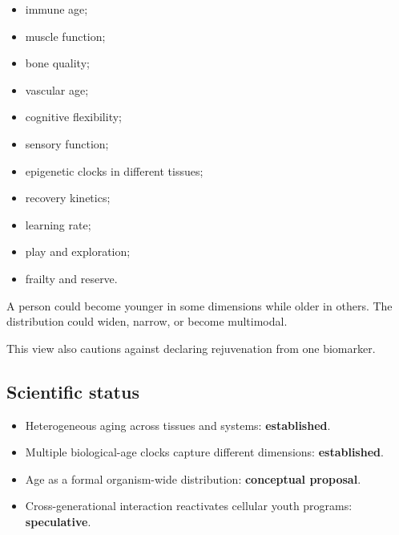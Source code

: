 \begin{itemize}
\tightlist
\item
  immune age;
\item
  muscle function;
\item
  bone quality;
\item
  vascular age;
\item
  cognitive flexibility;
\item
  sensory function;
\item
  epigenetic clocks in different tissues;
\item
  recovery kinetics;
\item
  learning rate;
\item
  play and exploration;
\item
  frailty and reserve.
\end{itemize}

A person could become younger in some dimensions while older in others. The distribution could widen, narrow, or become multimodal.

This view also cautions against declaring rejuvenation from one biomarker.

\subsection{Scientific status}

\begin{itemize}
\tightlist
\item
  Heterogeneous aging across tissues and systems: \textbf{established}.
\item
  Multiple biological-age clocks capture different dimensions: \textbf{established}.
\item
  Age as a formal organism-wide distribution: \textbf{conceptual proposal}.
\item
  Cross-generational interaction reactivates cellular youth programs: \textbf{speculative}.
\end{itemize}

